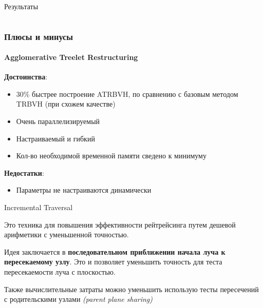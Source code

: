 \documentclass{beamer}
\begin{document}
\begin{frame}[t]{Результаты}
\begin{columns}
    \end{columns}

    \begin{center}
    \end{center}
\end{frame}

\begin{frame}[t]
    \frametitle{Плюсы и минусы}
    \framesubtitle{Agglomerative Treelet Restructuring}
    \textbf{Достоинства}:
    \begin{itemize}
        \item
            30\% быстрее построение ATRBVH, по сравнению с базовым методом TRBVH (при схожем качестве)
        \item
            Очень параллелизируемый
        \item
            Настраиваемый и гибкий
        \item
            Кол-во необходимой временной памяти сведено к минимуму
    \end{itemize}
    \textbf{Недостатки}:
    \begin{itemize}
        \item
            Параметры не настраиваются динамически
    \end{itemize}
\end{frame}

\begin{frame}{Incremental Traversal}
    \begin{block}{}
        Это техника для повышения эффективности рейтрейсинга путем дешевой арифметики с уменьшенной точностью.
    \end{block}
    Идея заключается в \textbf{последовательном приближении начала луча к пересекаемому узлу}.
    Это и позволяет уменьшить точность для теста пересекаемости луча с плоскостью.
    \begin{block}{}
        Также вычислительные затраты можно уменьшить использую тесты пересечений с родительскими узлами
        \textit{(parent plane sharing)}
    \end{block}
\end{frame}
\end{document}
